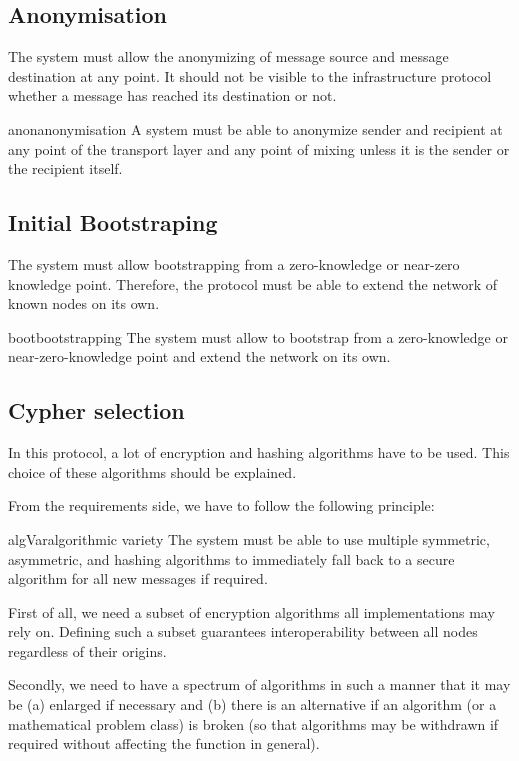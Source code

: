 \subsection{Anonymisation}
The system must allow the anonymizing of message source and message destination at any point. It should not be visible to the infrastructure protocol whether a message has reached its destination or not. 

\begin{requirement}{anon}{anonymisation}
	A system must be able to anonymize sender and recipient at any point of the transport layer and any point of mixing unless it is the sender or the recipient itself.
\end{requirement}

\subsection{Initial Bootstraping}
The system must allow bootstrapping from a zero-knowledge or near-zero knowledge point. Therefore, the protocol must be able to extend the network of known nodes on its own.

\begin{requirement}{boot}{bootstrapping}
	The system must allow to bootstrap from a zero-knowledge or near-zero-knowledge point and extend the network on its own. 
\end{requirement}

\subsection{Cypher selection}
In this protocol, a lot of encryption and hashing algorithms have to be used. This choice of these algorithms should be explained. 

From the requirements side, we have to follow the following principle:
\begin{requirement}{algVar}{algorithmic variety}
	The system must be able to use multiple symmetric, asymmetric, and hashing algorithms to immediately fall back to a secure algorithm for all new messages if required. 
\end{requirement}

First of all, we need a subset of encryption algorithms all implementations may rely on. Defining such a subset guarantees interoperability between all nodes regardless of their origins. 

Secondly, we need to have a spectrum of algorithms in such a manner that it may be (a) enlarged if necessary and (b) there is an alternative if an algorithm (or a mathematical problem class) is broken (so that algorithms may be withdrawn if required without affecting the function in general). 

